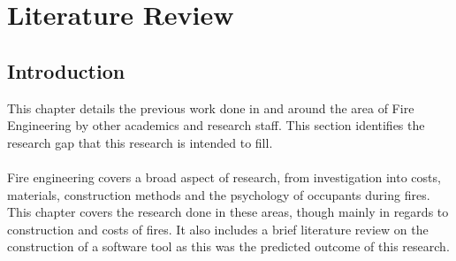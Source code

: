 \documentclass[table,a4paper,oneside]{book}
\begin{document}
\onehalfspacing

\chapter{Literature Review}
\label{chapter:Lit_Review}
\acresetall

\section{Introduction}
\label{sec:Introduction}
This chapter details the previous work done in and around the area of Fire Engineering by other academics and research staff. This section identifies the research gap that this research is intended to fill.
\\
\\
Fire engineering covers a broad aspect of research, from investigation into costs, materials, construction methods and the psychology of occupants during fires. This chapter covers the research done in these areas, though mainly in regards to construction and costs of fires. It also includes a brief literature review on the construction of a software tool as this was the predicted outcome of this research.
\end{document}
